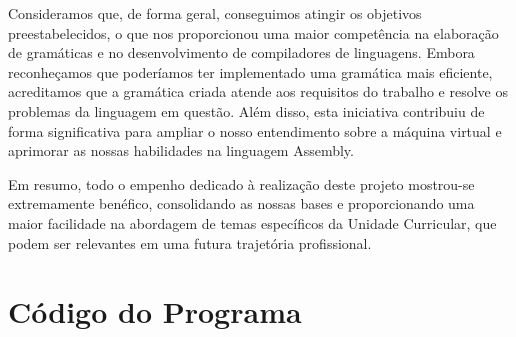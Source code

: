 \documentclass[11pt,a4paper]{report}
\begin{document}
Consideramos que, de forma geral, conseguimos atingir os objetivos preestabelecidos, o que nos proporcionou uma maior competência na elaboração de gramáticas e no desenvolvimento de compiladores de linguagens. Embora reconheçamos que poderíamos ter implementado uma gramática mais eficiente, acreditamos que a gramática criada atende aos requisitos do trabalho e resolve os problemas da linguagem em questão. Além disso, esta iniciativa contribuiu de forma significativa para ampliar o nosso entendimento sobre a máquina virtual e aprimorar as nossas habilidades na linguagem Assembly.

Em resumo, todo o empenho dedicado à realização deste projeto mostrou-se extremamente benéfico, consolidando as nossas bases e proporcionando uma maior facilidade na abordagem de temas específicos da Unidade Curricular, que podem ser relevantes em uma futura trajetória profissional.

\appendix %
\chapter{Código do Programa}
\end{document}

